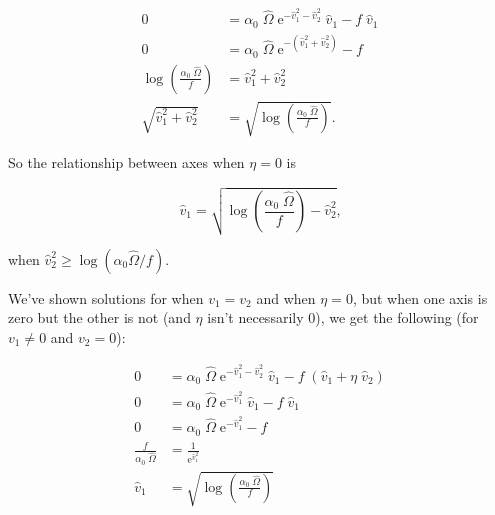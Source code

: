 \begin{equation*}
\begin{split}
    0 &= \alpha_0 \; \hat{\Omega} \;
            \textrm{e}^{-\hat{v}_{1}^2 - \hat{v}_{2}^2} \; \hat{v}_{1}
        - f \; \hat{v}_{1} \\
    0 &= \alpha_0 \; \hat{\Omega} \;
        \textrm{e}^{- ( \hat{v}_{1}^2 + \hat{v}_{2}^2) }
        - f \\
    \log \left( \frac{\alpha_0 \; \hat{\Omega}}{ f } \right) &=
        \hat{v}_{1}^2 + \hat{v}_{2}^2 \\
     \sqrt{ \hat{v}_{1}^2 + \hat{v}_{2}^2 } &=
        \sqrt{ \log \left( \frac{\alpha_0 \; \hat{\Omega}}{ f } \right)}
    \textrm{.}
\end{split}
\end{equation*}

\noindent So the relationship between axes when $\eta = 0$ is

$$
    \hat{v}_{1} =
    \sqrt{
        \log \left( \frac{\alpha_0 \; \hat{\Omega}}{ f } \right) -
        \hat{v}_{2}^2
    }
    \textrm{,}
$$

\noindent when $\hat{v}_{2}^2 \ge \log (\alpha_0 \hat{\Omega} / f)$.

We've shown solutions for when $v_1 = v_2$ and when $\eta = 0$, but
when one axis is zero but the other is not (and $\eta$ isn't necessarily 0),
we get the following (for $v_1 \ne 0$ and $v_2 = 0$):

\begin{equation}
\begin{split}
    0 &=
        \alpha_0 \; \hat{\Omega} \;
            \textrm{e}^{-\hat{v}_{1}^2 - \hat{v}_{2}^2} \; \hat{v}_{1}
        - f \; ( \hat{v}_{1} + \eta \; \hat{v}_{2} ) \\
    0 &=
        \alpha_0 \; \hat{\Omega} \;
            \textrm{e}^{-\hat{v}_{1}^2} \; \hat{v}_{1}
        - f \; \hat{v}_{1} \\
    0 &=
        \alpha_0 \; \hat{\Omega} \;
            \textrm{e}^{-\hat{v}_{1}^2} - f \\
    \frac{f}{\alpha_0 \; \hat{\Omega}} &=
         \frac{1}{\textrm{e}^{\hat{v}_{1}^2}} \\
    \hat{v}_{1} &= \sqrt{ \log \left( \frac{\alpha_0 \; \hat{\Omega}}{f} \right) }
\end{split}
\label{eq:two-axes-v1-nonzero-v2-zero}
\end{equation}







